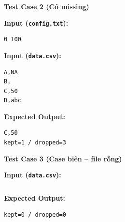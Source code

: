 \textbf{Test Case 2 (Có missing)}

\textbf{Input (\texttt{config.txt}):}
\begin{lstlisting}
0 100
\end{lstlisting}

\textbf{Input (\texttt{data.csv}):}
\begin{lstlisting}
A,NA
B,
C,50
D,abc
\end{lstlisting}

\textbf{Expected Output:}
\begin{lstlisting}
C,50
kept=1 / dropped=3
\end{lstlisting}

\vspace{0.5cm}

\textbf{Test Case 3 (Case biên -- file rỗng)}

\textbf{Input (\texttt{data.csv}):}
\begin{lstlisting}
\end{lstlisting}

\textbf{Expected Output:}
\begin{lstlisting}
kept=0 / dropped=0
\end{lstlisting}